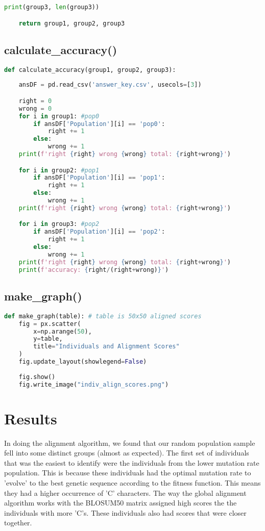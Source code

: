 \documentclass[a4paper, 12pt, one column]{article}
\begin{document}
\begin{multicols}{2}
\begin{lstlisting}[language = python]
    print(group3, len(group3))

    return group1, group2, group3
\end{lstlisting}

\subsection{calculate\_accuracy()}

\begin{lstlisting}[language = python]
def calculate_accuracy(group1, group2, group3):
    
    ansDF = pd.read_csv('answer_key.csv', usecols=[3])

    right = 0
    wrong = 0
    for i in group1: #pop0
        if ansDF['Population'][i] == 'pop0':
            right += 1
        else:
            wrong += 1
    print(f'right {right} wrong {wrong} total: {right+wrong}')

    for i in group2: #pop1
        if ansDF['Population'][i] == 'pop1':
            right += 1
        else:
            wrong += 1
    print(f'right {right} wrong {wrong} total: {right+wrong}')

    for i in group3: #pop2
        if ansDF['Population'][i] == 'pop2':
            right += 1
        else:
            wrong += 1
    print(f'right {right} wrong {wrong} total: {right+wrong}')
    print(f'accuracy: {right/(right+wrong)}')
\end{lstlisting}

\subsection{make\_graph()}

\begin{lstlisting}[language = python]
def make_graph(table): # table is 50x50 aligned scores
    fig = px.scatter(
        x=np.arange(50),
        y=table,
        title="Individuals and Alignment Scores"
    )
    fig.update_layout(showlegend=False)
        
    fig.show()
    fig.write_image("indiv_align_scores.png")
\end{lstlisting}

\section{Results}

In doing the alignment algorithm, we found that our random population sample fell into some distinct groups (almost as expected). The first set of individuals that was the easiest to identify were the individuals from the lower mutation rate population. This is because these individuals had the optimal mutation rate to 'evolve' to the best genetic sequence according to the fitness function. This means they had a higher occurrence of 'C' characters. The way the global alignment algorithm works with the BLOSUM50 matrix assigned high scores the the individuals with more 'C's. These individuals also had scores that were closer together.


\end{multicols}
\end{document}
